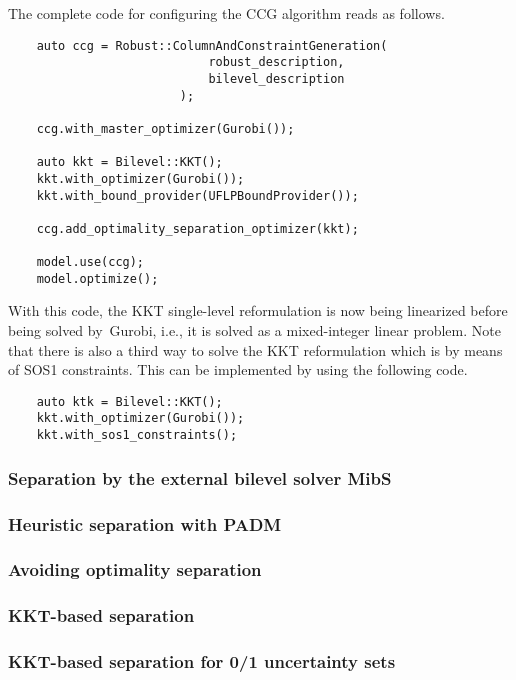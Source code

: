 The complete code for configuring the CCG algorithm reads as follows.
\begin{lstlisting}
    auto ccg = Robust::ColumnAndConstraintGeneration(
                            robust_description,
                            bilevel_description
                        );
    
    ccg.with_master_optimizer(Gurobi());

    auto kkt = Bilevel::KKT();
    kkt.with_optimizer(Gurobi());
    kkt.with_bound_provider(UFLPBoundProvider());

    ccg.add_optimality_separation_optimizer(kkt);

    model.use(ccg);
    model.optimize();
\end{lstlisting}

With this code, the KKT single-level reformulation is now being linearized
before being solved by~\textsf{Gurobi}, i.e., it is solved as a mixed-integer
linear problem. Note that there is also a third way to solve the KKT
reformulation which is by means of SOS1 constraints. This can be implemented
by using the following code.
%
\begin{lstlisting}
    auto ktk = Bilevel::KKT();
    kkt.with_optimizer(Gurobi());
    kkt.with_sos1_constraints();   
\end{lstlisting}

\subsubsection*{Separation by the external bilevel solver \textsf{MibS}}


\subsubsection*{Heuristic separation with PADM}


\subsubsection{Avoiding optimality separation}

\subsubsection*{KKT-based separation}


\subsubsection*{KKT-based separation for 0/1 uncertainty sets}

